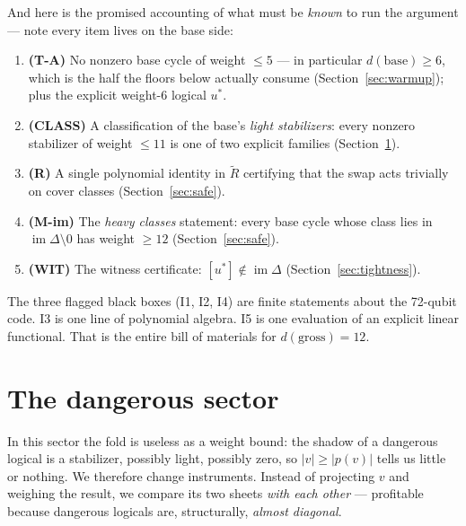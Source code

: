 \documentclass[11pt]{article}
\theoremstyle{plain}
\theoremstyle{definition}
\theoremstyle{remark}
\newcommand{\imD}{\operatorname{im}\Delta}
\newcommand{\base}{\mathrm{base}}
\newcommand{\Rcov}{\widetilde{R}}
\newcommand{\wt}[1]{\lvert #1\rvert}
\begin{document}
And here is the promised accounting of what must be \emph{known} to run the
argument --- note every item lives on the base side:

\begin{enumerate}[leftmargin=2.4em,label=\textbf{I\arabic*.}]
\item \textbf{(T-A)} No nonzero base cycle of weight $\leq 5$ --- in
  particular $d(\base) \geq 6$, which is the half the floors below actually
  consume (Section~\ref{sec:warmup}); plus the explicit weight-6 logical
  $u^*$.
\item \textbf{(CLASS)} A classification of the base's \emph{light
  stabilizers}: every nonzero stabilizer of weight $\leq 11$ is one of two
  explicit families (Section~\ref{sec:dangerous}).
\item \textbf{(R)} A single polynomial identity in $\Rcov$ certifying that the
  swap acts trivially on cover classes (Section~\ref{sec:safe}).
\item \textbf{(M-im)} The \emph{heavy classes} statement: every base cycle
  whose class lies in $\imD \setminus 0$ has weight $\geq 12$
  (Section~\ref{sec:safe}).
\item \textbf{(WIT)} The witness certificate: $[u^*] \notin \imD$
  (Section~\ref{sec:tightness}).
\end{enumerate}

The three flagged black boxes (I1, I2, I4) are finite statements about the
72-qubit code. I3 is one line of polynomial algebra. I5 is one evaluation of
an explicit linear functional. That is the entire bill of materials for
$d(\mathrm{gross}) = 12$.

\section{The dangerous sector}
\label{sec:dangerous}

In this sector the fold is useless as a weight bound: the shadow of a
dangerous logical is a stabilizer, possibly light, possibly zero, so
$\wt{v} \geq \wt{p(v)}$ tells us little or nothing. We therefore change
instruments. Instead of projecting $v$ and weighing the result, we compare
its two sheets \emph{with each other} --- profitable because dangerous
logicals are, structurally, \emph{almost diagonal}.
\end{document}
